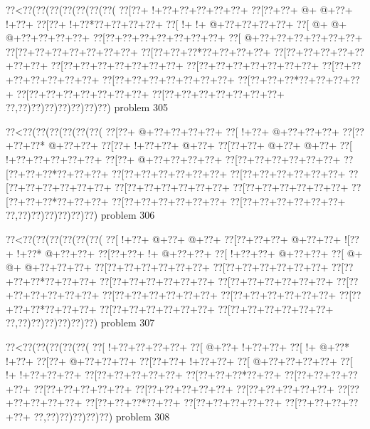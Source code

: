 \vbox{\vbox{\goo
\0??<\0??(\0??(\0??(\0??(\0??(\0??(\0??(
\0??[\0??+\- !+\0??+\0??+\0??+\0??+\0??+
\0??[\0??+\0??+\- @+\- @+\0??+\- !+\0??+
\0??[\0??+\- !+\0??*\0??+\0??+\0??+\0??+
\0??[\- !+\- !+\- @+\0??+\0??+\0??+\0??+
\0??[\- @+\- @+\- @+\0??+\0??+\0??+\0??+
\0??[\0??+\0??+\0??+\0??+\0??+\0??+\0??+
\0??[\- @+\0??+\0??+\0??+\0??+\0??+\0??+
\0??[\0??+\0??+\0??+\0??+\0??+\0??+\0??+
\0??[\0??+\0??+\0??*\0??+\0??+\0??+\0??+
\0??[\0??+\0??+\0??+\0??+\0??+\0??+\0??+
\0??[\0??+\0??+\0??+\0??+\0??+\0??+\0??+
\0??[\0??+\0??+\0??+\0??+\0??+\0??+\0??+
\0??[\0??+\0??+\0??+\0??+\0??+\0??+\0??+
\0??[\0??+\0??+\0??+\0??+\0??+\0??+\0??+
\0??[\0??+\0??+\0??*\0??+\0??+\0??+\0??+
\0??[\0??+\0??+\0??+\0??+\0??+\0??+\0??+
\0??[\0??+\0??+\0??+\0??+\0??+\0??+\0??+
\0??,\0??)\0??)\0??)\0??)\0??)\0??)\0??)
}
\hfil problem 305\hfil\break
}

\vbox{\vbox{\goo
\0??<\0??(\0??(\0??(\0??(\0??(\0??(
\0??[\0??+\- @+\0??+\0??+\0??+\0??+
\0??[\- !+\0??+\- @+\0??+\0??+\0??+
\0??[\0??+\0??+\0??*\- @+\0??+\0??+
\0??[\0??+\- !+\0??+\0??+\- @+\0??+
\0??[\0??+\0??+\- @+\0??+\- @+\0??+
\0??[\- !+\0??+\0??+\0??+\0??+\0??+
\0??[\0??+\- @+\0??+\0??+\0??+\0??+
\0??[\0??+\0??+\0??+\0??+\0??+\0??+
\0??[\0??+\0??+\0??*\0??+\0??+\0??+
\0??[\0??+\0??+\0??+\0??+\0??+\0??+
\0??[\0??+\0??+\0??+\0??+\0??+\0??+
\0??[\0??+\0??+\0??+\0??+\0??+\0??+
\0??[\0??+\0??+\0??+\0??+\0??+\0??+
\0??[\0??+\0??+\0??+\0??+\0??+\0??+
\0??[\0??+\0??+\0??*\0??+\0??+\0??+
\0??[\0??+\0??+\0??+\0??+\0??+\0??+
\0??[\0??+\0??+\0??+\0??+\0??+\0??+
\0??,\0??)\0??)\0??)\0??)\0??)\0??)
}
\hfil problem 306\hfil\break
}

\vbox{\vbox{\goo
\0??<\0??(\0??(\0??(\0??(\0??(\0??(
\0??[\- !+\0??+\- @+\0??+\- @+\0??+
\0??[\0??+\0??+\0??+\- @+\0??+\0??+
\- ![\0??+\- !+\0??*\- @+\0??+\0??+
\0??[\0??+\0??+\- !+\- @+\0??+\0??+
\0??[\- !+\0??+\0??+\- @+\0??+\0??+
\0??[\- @+\- @+\- @+\0??+\0??+\0??+
\0??[\0??+\0??+\0??+\0??+\0??+\0??+
\0??[\0??+\0??+\0??+\0??+\0??+\0??+
\0??[\0??+\0??+\0??*\0??+\0??+\0??+
\0??[\0??+\0??+\0??+\0??+\0??+\0??+
\0??[\0??+\0??+\0??+\0??+\0??+\0??+
\0??[\0??+\0??+\0??+\0??+\0??+\0??+
\0??[\0??+\0??+\0??+\0??+\0??+\0??+
\0??[\0??+\0??+\0??+\0??+\0??+\0??+
\0??[\0??+\0??+\0??*\0??+\0??+\0??+
\0??[\0??+\0??+\0??+\0??+\0??+\0??+
\0??[\0??+\0??+\0??+\0??+\0??+\0??+
\0??,\0??)\0??)\0??)\0??)\0??)\0??)
}
\hfil problem 307\hfil\break
}

\vbox{\vbox{\goo
\0??<\0??(\0??(\0??(\0??(\0??(
\0??[\- !+\0??+\0??+\0??+\0??+
\0??[\- @+\0??+\- !+\0??+\0??+
\0??[\- !+\- @+\0??*\- !+\0??+
\0??[\0??+\- @+\0??+\0??+\0??+
\0??[\0??+\0??+\- !+\0??+\0??+
\0??[\- @+\0??+\0??+\0??+\0??+
\0??[\- !+\- !+\0??+\0??+\0??+
\0??[\0??+\0??+\0??+\0??+\0??+
\0??[\0??+\0??+\0??*\0??+\0??+
\0??[\0??+\0??+\0??+\0??+\0??+
\0??[\0??+\0??+\0??+\0??+\0??+
\0??[\0??+\0??+\0??+\0??+\0??+
\0??[\0??+\0??+\0??+\0??+\0??+
\0??[\0??+\0??+\0??+\0??+\0??+
\0??[\0??+\0??+\0??*\0??+\0??+
\0??[\0??+\0??+\0??+\0??+\0??+
\0??[\0??+\0??+\0??+\0??+\0??+
\0??,\0??)\0??)\0??)\0??)\0??)
}
\hfil problem 308\hfil\break
}

